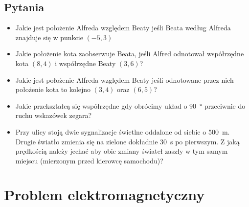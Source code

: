 \documentclass[10pt,twocolumn,fleqn,polish]{article}
\begin{document}
\subsection*{Pytania}
\begin{itemize}
  \item Jakie jest położenie Alfreda względem Beaty jeśli Beata według Alfreda
        znajduje się w punkcie $(-5, 3)$
  \item Jakie położenie kota zaobserwuje Beata, jeśli Alfred odnotował
        współrzędne kota $(8, 4)$ i współrzędne Beaty $(3, 6)$?
  \item Jakie jest położenie Alfreda względem Beaty jeśli
        odnotowane przez nich położenie kota to kolejno $(3, 4)$ oraz $(6,5)$?
  \item Jakie przekształcą się współrzędne gdy obrócimy układ o \SI{90}{\degree}
        przeciwnie do ruchu wskazówek zegara?
  \item Przy ulicy stoją dwie sygnalizacje świetlne oddalone od siebie o \SI{500}{\metre}.
        Drugie światło zmienia się na zielone dokładnie \SI{30}{s} po pierwszym.
        Z jaką prędkością należy jechać aby obie zmiany świateł zaszły w tym samym miejscu
        (mierzonym przed kierowcę samochodu)?
\end{itemize}
\newpage

\section{Problem elektromagnetyczny}
\end{document}
